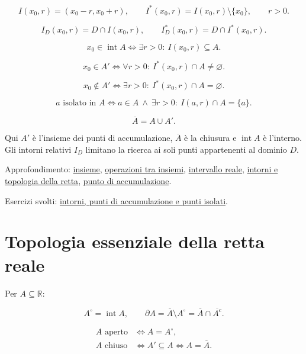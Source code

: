 \[
I(x_0,r)=(x_0-r,x_0+r),
\qquad
I^*(x_0,r)=I(x_0,r)\setminus\{x_0\},
\qquad r>0.
\]

\[
I_D(x_0,r)=D\cap I(x_0,r),
\qquad
I_D^*(x_0,r)=D\cap I^*(x_0,r).
\]

\[
x_0\in\operatorname{int}A
\Longleftrightarrow
\exists r>0:\ I(x_0,r)\subseteq A.
\]

\[
x_0\in A'
\Longleftrightarrow
\forall r>0:\ I^*(x_0,r)\cap A\ne\varnothing.
\]

\[
x_0\notin A'
\Longleftrightarrow
\exists r>0:\ I^*(x_0,r)\cap A=\varnothing.
\]

\[
a\text{ isolato in }A
\Longleftrightarrow
a\in A\ \land\ \exists r>0:\ I(a,r)\cap A=\{a\}.
\]

\[
\overline A=A\cup A'.
\]

Qui \(A'\) è l'insieme dei punti di accumulazione, \(\overline A\) è la chiusura e \(\operatorname{int}A\) è l'interno. Gli intorni relativi \(I_D\) limitano la ricerca ai soli punti appartenenti al dominio \(D\).

Approfondimento: \href{https://ingegnerismo.it/matematica/insieme/}{insieme}, \href{https://ingegnerismo.it/matematica/operazioni-tra-insiemi/}{operazioni tra insiemi}, \href{https://ingegnerismo.it/matematica/intervallo-reale/}{intervallo reale}, \href{https://ingegnerismo.it/matematica/intorni-e-topologia-della-retta/}{intorni e topologia della retta}, \href{https://ingegnerismo.it/matematica/punto-di-accumulazione/}{punto di accumulazione}.

Esercizi svolti: \href{https://ingegnerismo.it/matematica/intorni-accumulazione-esercizi/}{intorni, punti di accumulazione e punti isolati}.

\section{Topologia essenziale della retta reale}\label{topologia-essenziale-della-retta-reale}

Per \(A\subseteq\mathbb R\):

\[
A^\circ=\operatorname{int}A,
\qquad
\partial A=\overline A\setminus A^\circ
=\overline A\cap\overline{A^c}.
\]

\[
\begin{aligned}
A\text{ aperto}
&\Longleftrightarrow A=A^\circ,\\
A\text{ chiuso}
&\Longleftrightarrow A'\subseteq A
\Longleftrightarrow A=\overline A.
\end{aligned}
\]

